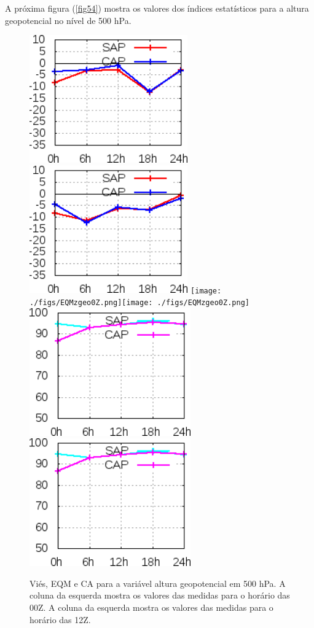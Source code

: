 A próxima figura (\autoref{fig54}) mostra os valores dos índices estatísticos para a altura geopotencial no nível de 500 hPa.

\begin{figure}[!hbp]
\includegraphics[height=5.5cm]{./figs/VIES500zgeo0Z.png}\includegraphics[height=5.5cm]{./figs/VIES500zgeo12Z.png}
\texttt{[image: ./figs/EQMzgeo0Z.png]}\texttt{[image: ./figs/EQMzgeo0Z.png]}
\includegraphics[height=5.5cm]{./figs/CA500zgeo0Z.png}\includegraphics[height=5.5cm]{./figs/CA500zgeo0Z.png}
\caption{Viés, EQM e CA para a variável altura geopotencial em 500 hPa. A coluna da esquerda mostra os valores das medidas para o horário das 00Z. A coluna da esquerda mostra os valores das medidas para o horário das 12Z.}
\label{fig54}
\end{figure}

